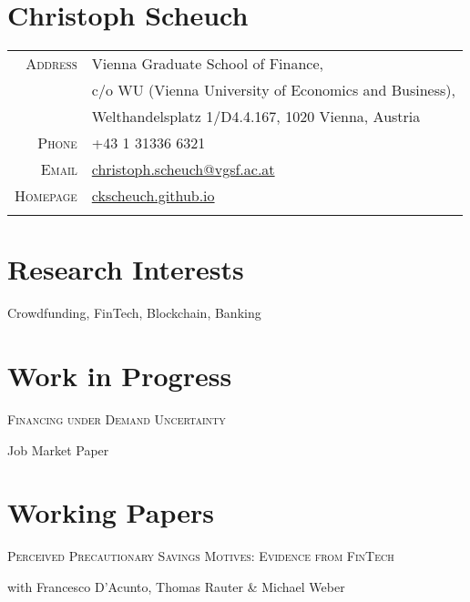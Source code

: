 \documentclass[a4paper,11pt]{article}
\begin{document}

\section{Christoph Scheuch}
\centering
	\begin{tabularx}{0.75\linewidth}{r|p{11cm}}
		\textsc{Address} & Vienna Graduate School of Finance,\\
		& c/o WU (Vienna University of Economics and Business), \\
		& Welthandelsplatz 1/D4.4.167, 1020 Vienna, Austria \\
		\textsc{Phone} & +43 1 31336 6321\\
		\textsc{Email} & \href{mailto:christoph.scheuch@vgsf.ac.at}{christoph.scheuch@vgsf.ac.at}\\
		\textsc{Homepage} & \href{https://ckscheuch.github.io}{ckscheuch.github.io}\\
		\multicolumn{2}{c}{}
	\end{tabularx}

\section{Research Interests}
\justify
\vspace{11pt}
Crowdfunding, FinTech, Blockchain, Banking
\vspace{11pt}

\section{Work in Progress}
\justify
\vspace{11pt}
\noindent\textsc{Financing under Demand Uncertainty} 

Job Market Paper \\


\section{Working Papers}
\justify
\vspace{11pt}

\noindent\textsc{Perceived Precautionary Savings Motives: Evidence from FinTech}

with Francesco D'Acunto, Thomas Rauter \& Michael Weber \\
\end{document}
